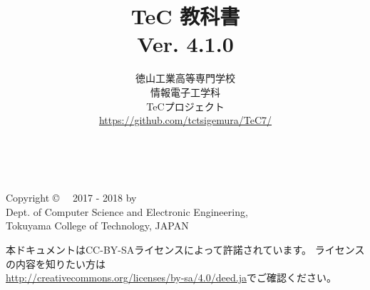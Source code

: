 \documentclass[a4paper,twocolumn,twoside]{ltjsbook}   %
\begin{document}
\frontmatter
\title{TeC 教科書\\Ver. 4.1.0}
\author{徳山工業高等専門学校\\情報電子工学科\\TeCプロジェクト\\
\url{https://github.com/tctsigemura/TeC7/}}
\date{}
\maketitle

\thispagestyle{empty}
\onecolumn
~
\vfill
\begin{flushleft}
Copyright \copyright ~~ 2017 - 2018 by \\
Dept. of Computer Science and Electronic Engineering, \\
Tokuyama College of Technology, JAPAN
\end{flushleft}

\vspace{0.8cm}
本ドキュメントはCC-BY-SAライセンスによって許諾されています。
ライセンスの内容を知りたい方は\\
\url{http://creativecommons.org/licenses/by-sa/4.0/deed.ja}でご確認ください。

\setcounter{tocdepth}{2}
\tableofcontents

\twocolumn
\mainmatter

\appendix

\backmatter
\pagestyle{empty}
\onecolumn
~
\vfill\vfill\vfill
\begin{center}
\end{center}
\vfill
\end{document}
